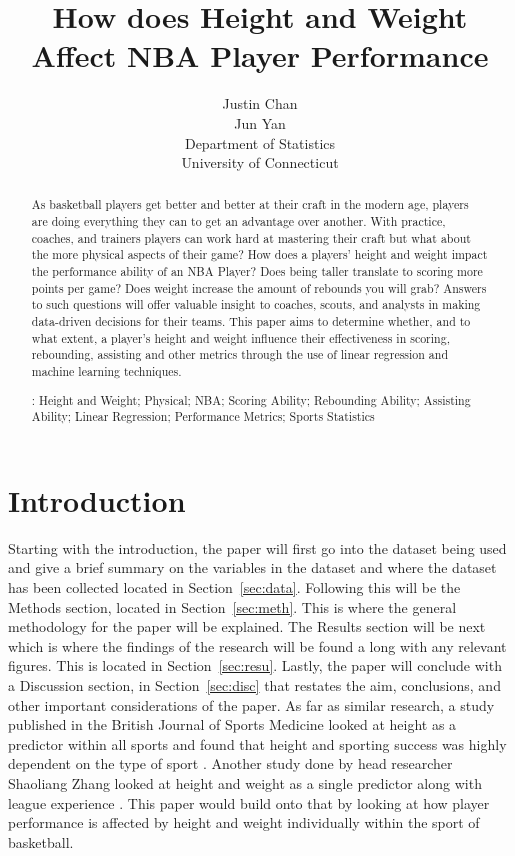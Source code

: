 \documentclass[12pt]{article}
\title{How does Height and Weight Affect NBA Player Performance}
\author{Justin Chan\\
	Jun Yan\\[2ex]
	Department of Statistics\\
	University of Connecticut\\
}
\begin{document}
\maketitle
\doublespace

\begin{abstract}

As basketball players get better and better at their craft in the modern age, players are doing everything 
they can to get an advantage over another. With practice, coaches, and trainers players can work hard at 
mastering their craft but what about the more physical aspects of their game? How does a players' height
and weight impact the performance ability of an NBA Player? Does being taller translate to scoring more
points per game? Does weight increase the amount of rebounds you will grab? Answers to such questions
will offer valuable insight to coaches, scouts, and analysts in making data-driven decisions for their teams.
This paper aims to determine whether, and to what extent, a player's height and weight influence their 
effectiveness in scoring, rebounding, assisting and other metrics through the use of linear regression and
machine learning techniques.

\bigskip
{}:
Height and Weight;
Physical;
NBA;
Scoring Ability;
Rebounding Ability;
Assisting Ability;
Linear Regression;
Performance Metrics;
Sports Statistics

\end{abstract}

\section{Introduction}
\label{sec:intro}

Starting with the introduction, the paper will first go into the dataset being used and give a brief summary on the 
variables in the dataset and where the dataset has been collected located in Section~\ref{sec:data}. Following this
will be the Methods section, located in Section~\ref{sec:meth}. This is where the general methodology for the paper
will be explained. The Results section will be next which is where the findings of the research will be found a long 
with any relevant figures. This is located in Section~\ref{sec:resu}. Lastly, the paper will conclude with a Discussion 
section, in Section~\ref{sec:disc} that restates the aim, conclusions, and other important considerations of the paper.
As far as similar research, a study published in the British Journal of Sports Medicine looked at height as a predictor 
within all sports and found that height and sporting success was highly dependent on the type of sport \citep{tucker2012makes}. 
Another study done by head researcher Shaoliang Zhang looked at height and weight as a single predictor along with 
league experience \citep{zhang2017performance}. This paper would build onto that by looking at how player 
performance is affected by height and weight individually within the sport of basketball.
\end{document}

